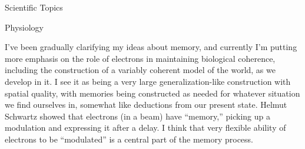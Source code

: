 \documentclass[11pt,oneside,openany,extrafontsizes]{memoir}
\begin{document}
\begin{standalonequote}{Scientific Topics}
    \begin{note}
        Physiology
    \end{note}

    \begin{answer}
        I've been gradually clarifying my ideas about memory, and currently I'm putting more emphasis on the role of electrons in maintaining biological coherence, including the construction of a variably coherent model of the world, as we develop in it. I see it as being a very large generalization-like construction with spatial quality, with memories being constructed as needed for whatever situation we find ourselves in, somewhat like deductions from our present state. Helmut Schwartz showed that electrons (in a beam) have \enquote{memory,} picking up a modulation and expressing it after a delay. I think that very flexible ability of electrons to be \enquote{modulated} is a central part of the memory process.
    \end{answer}
\end{standalonequote}
\end{document}
